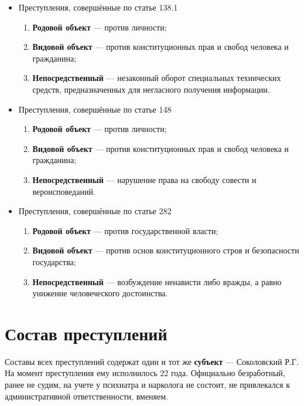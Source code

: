 \documentclass[a4paper]{article}
\begin{document}
		\begin{itemize}
			\item Преступления, совершённые по статье 138.1
			
			\begin{enumerate}
				\item \textbf{Родовой объект} --- против личности;
				
				\item \textbf{Видовой объект} --- против конституционных прав и свобод человека и гражданина;
				
				\item \textbf{Непосредственный} --- незаконный оборот специальных технических средств, предназначенных для негласного получения информации.
			\end{enumerate}
			
			\item Преступления, совершённые по статье 148
			
			\begin{enumerate}
				\item \textbf{Родовой объект} --- против личности;
				
				\item \textbf{Видовой объект} --- против конституционных прав и свобод человека и гражданина;
				
				\item \textbf{Непосредственный} --- нарушение права на свободу совести и вероисповеданий.
			\end{enumerate}
			
			\item Преступления, совершённые по статье 282
			
			\begin{enumerate}
				\item \textbf{Родовой объект} --- против государственной власти;
				
				\item \textbf{Видовой объект} --- против основ конституционного строя и безопасности государства;
				
				\item \textbf{Непосредственный} --- возбуждение ненависти либо вражды, а равно унижение человеческого достоинства.
			\end{enumerate}	
		\end{itemize}

	\section{Состав преступлений}
		Составы всех преступлений содержат один и тот же \textbf{субъект} --- Соколовский Р.Г. На момент преступления ему исполнилось 22 года. Официально безработный, ранее не судим, на учете у психиатра и нарколога не состоит, не привлекался к административной ответственности, вменяем.
	
\end{document}
